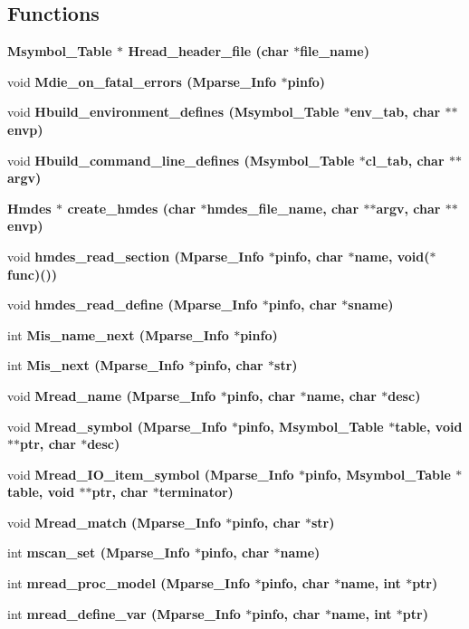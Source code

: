 \subsection*{Functions}
\begin{CompactItemize}
\item 
\bf{Msymbol\_\-Table} $\ast$ \bf{Hread\_\-header\_\-file} (char $\ast$file\_\-name)
\item 
void \bf{Mdie\_\-on\_\-fatal\_\-errors} (\bf{Mparse\_\-Info} $\ast$pinfo)
\item 
void \bf{Hbuild\_\-environment\_\-defines} (\bf{Msymbol\_\-Table} $\ast$env\_\-tab, char $\ast$$\ast$envp)
\item 
void \bf{Hbuild\_\-command\_\-line\_\-defines} (\bf{Msymbol\_\-Table} $\ast$cl\_\-tab, char $\ast$$\ast$argv)
\item 
\bf{Hmdes} $\ast$ \bf{create\_\-hmdes} (char $\ast$hmdes\_\-file\_\-name, char $\ast$$\ast$argv, char $\ast$$\ast$envp)
\item 
void \bf{hmdes\_\-read\_\-section} (\bf{Mparse\_\-Info} $\ast$pinfo, char $\ast$\bf{name}, void($\ast$func)())
\item 
void \bf{hmdes\_\-read\_\-define} (\bf{Mparse\_\-Info} $\ast$pinfo, char $\ast$sname)
\item 
int \bf{Mis\_\-name\_\-next} (\bf{Mparse\_\-Info} $\ast$pinfo)
\item 
int \bf{Mis\_\-next} (\bf{Mparse\_\-Info} $\ast$pinfo, char $\ast$str)
\item 
void \bf{Mread\_\-name} (\bf{Mparse\_\-Info} $\ast$pinfo, char $\ast$\bf{name}, char $\ast$desc)
\item 
void \bf{Mread\_\-symbol} (\bf{Mparse\_\-Info} $\ast$pinfo, \bf{Msymbol\_\-Table} $\ast$table, void $\ast$$\ast$ptr, char $\ast$desc)
\item 
void \bf{Mread\_\-IO\_\-item\_\-symbol} (\bf{Mparse\_\-Info} $\ast$pinfo, \bf{Msymbol\_\-Table} $\ast$table, void $\ast$$\ast$ptr, char $\ast$terminator)
\item 
void \bf{Mread\_\-match} (\bf{Mparse\_\-Info} $\ast$pinfo, char $\ast$str)
\item 
int \bf{mscan\_\-set} (\bf{Mparse\_\-Info} $\ast$pinfo, char $\ast$\bf{name})
\item 
int \bf{mread\_\-proc\_\-model} (\bf{Mparse\_\-Info} $\ast$pinfo, char $\ast$\bf{name}, int $\ast$ptr)
\item 
int \bf{mread\_\-define\_\-var} (\bf{Mparse\_\-Info} $\ast$pinfo, char $\ast$\bf{name}, int $\ast$ptr)
\item 

\end{CompactItemize}
